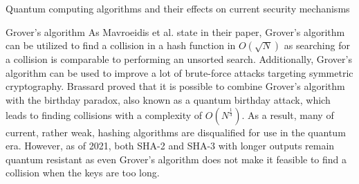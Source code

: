 \documentclass[aps,preprintnumbers,twocolumn]{revtex4}
\begin{document}
\begin{section}{Quantum computing algorithms and their effects on current security mechanisms}
\begin{subsection}{Grover's algorithm}
As Mavroeidis et al. \cite[p.4]{DBLP:journals/corr/abs-1804-00200} state in their paper, Grover's algorithm can be utilized to find a collision in a hash function in $O(\sqrt{N})$ as searching for a collision is comparable to performing an unsorted search. 
Additionally, Grover's algorithm can be used to improve a lot of brute-force attacks targeting symmetric cryptography.
Brassard proved \cite{1998} that it is possible to combine Grover's algorithm with the birthday paradox, 
also known as a quantum birthday attack, which leads to finding collisions with a complexity of $O(N^{\frac{1}{3}})$.
As a result, many of current, rather weak, hashing algorithms are disqualified for use in the quantum era. 
However, as of 2021, both SHA-2 and SHA-3 with longer outputs remain quantum resistant as even Grover's algorithm does not make it feasible to find a collision when the keys are too long.
\end{subsection}

\end{section}
\end{document}
